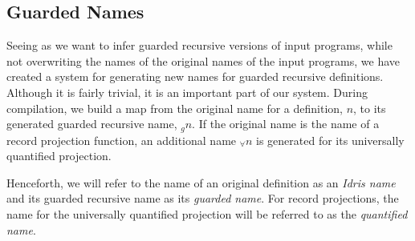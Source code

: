   

\subsection{Guarded Names}
Seeing as we want to infer guarded recursive versions of input programs, while not
overwriting the names of the original names of the input programs, we have created a system for
generating new names for guarded recursive definitions. Although it is fairly
trivial, it is an important part of our system. During compilation, we build a
map from the original name for a definition, $n$, to its generated guarded recursive name,
$_gn$. If the original name is the name of a record projection function, an
additional name $_{\forall}n$ is generated for its universally quantified
projection. 

Henceforth, we will refer to the name of an original definition as
an \emph{Idris name} and its guarded recursive name as its \emph{guarded name}. For
record projections, the name for the universally quantified projection will be
referred to as the \emph{quantified name}. 


